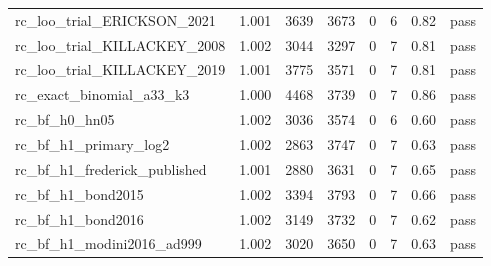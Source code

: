 \begin{tabular}{llrrrrll}
rc\_loo\_trial\_ERICKSON\_2021 & 1.001 & 3639 & 3673 & 0 & 6 & 0.82 & pass\\
rc\_loo\_trial\_KILLACKEY\_2008 & 1.002 & 3044 & 3297 & 0 & 7 & 0.81 & pass\\
rc\_loo\_trial\_KILLACKEY\_2019 & 1.001 & 3775 & 3571 & 0 & 7 & 0.81 & pass\\
rc\_exact\_binomial\_a33\_k3 & 1.000 & 4468 & 3739 & 0 & 7 & 0.86 & pass\\
rc\_bf\_h0\_hn05 & 1.002 & 3036 & 3574 & 0 & 6 & 0.60 & pass\\
rc\_bf\_h1\_primary\_log2 & 1.002 & 2863 & 3747 & 0 & 7 & 0.63 & pass\\
rc\_bf\_h1\_frederick\_published & 1.001 & 2880 & 3631 & 0 & 7 & 0.65 & pass\\
rc\_bf\_h1\_bond2015 & 1.002 & 3394 & 3793 & 0 & 7 & 0.66 & pass\\
rc\_bf\_h1\_bond2016 & 1.002 & 3149 & 3732 & 0 & 7 & 0.62 & pass\\
rc\_bf\_h1\_modini2016\_ad999 & 1.002 & 3020 & 3650 & 0 & 7 & 0.63 & pass\\
\bottomrule
\end{tabular}

